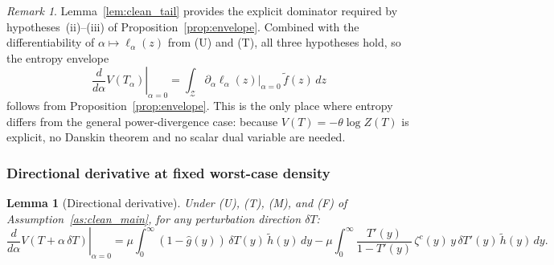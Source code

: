\documentclass[12pt,a4paper]{article}
\theoremstyle{definition}
\theoremstyle{plain}
\newtheorem{lemma}{Lemma}[section]
\theoremstyle{remark}
\newtheorem{remark}{Remark}[section]
\newcommand{\calZ}{\mathcal{Z}}
\begin{document}
\begin{remark}
Lemma~\ref{lem:clean_tail} provides the explicit dominator required by hypotheses~(ii)--(iii) of Proposition~\ref{prop:envelope}.  Combined with the differentiability of $\alpha \mapsto \ell_\alpha(z)$ from \textup{(U)} and \textup{(T)}, all three hypotheses hold, so the entropy envelope
\begin{equation}
\label{eq:clean_envelope}
  \left.\frac{d}{d\alpha}V(T_\alpha)\right|_{\alpha=0}
  = \int_\calZ \partial_\alpha \ell_\alpha(z)\big|_{\alpha=0}\,\widetilde{f}(z)\,dz
\end{equation}
follows from Proposition~\ref{prop:envelope}.  This is the only place where entropy differs from the general power-divergence case: because $V(T) = -\theta\log Z(T)$ is explicit, no Danskin theorem and no scalar dual variable are needed.
\end{remark}


\subsubsection{Directional derivative at fixed worst-case density}

\begin{lemma}[Directional derivative]
\label{lem:clean_directional}
Under \textup{(U)}, \textup{(T)}, \textup{(M)}, and \textup{(F)} of Assumption~\ref{as:clean_main}, for any perturbation direction $\delta T$:
\begin{equation}
\label{eq:clean_directional}
  \left.\frac{d}{d\alpha}V(T+\alpha\,\delta T)\right|_{\alpha=0}
  = \mu\int_0^\infty(1-\hat g(y))\,\delta T(y)\,\widetilde{h}(y)\,dy
  - \mu\int_0^\infty \frac{T'(y)}{1-T'(y)}\,\zeta^c(y)\,y\,\delta T'(y)\,\widetilde{h}(y)\,dy.
\end{equation}
\end{lemma}
\end{document}
